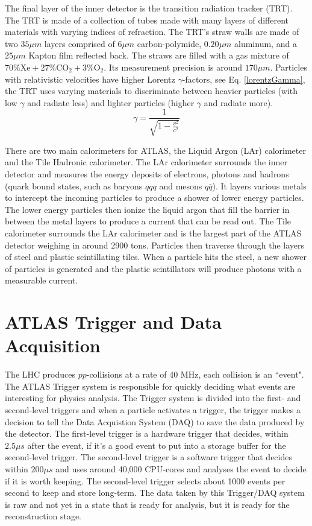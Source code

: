 The final layer of the inner detector is the transition radiation tracker (TRT). 
The TRT is made of a collection of tubes made with many layers of different materials with varying indices of refraction.
The TRT's straw walls are made of two $35\mu m$ layers comprised of $6\mu m$ carbon-polymide, $0.20 \mu m$ aluminum, and a $25\mu m$ Kapton film reflected back.\cite{TRT_2008}
The straws are filled with a gas mixture of $70\% \text{Xe} + 27\% \text{CO}_2 + 3\% \text{O}_2$. 
Its measurement precision is around $170 \mu m$. 
Particles with relativistic velocities have higher Lorentz $\gamma$-factors, see Eq. \eqref{lorentzGamma}, the TRT uses varying materials to discriminate between heavier particles (with low $\gamma$ and radiate less) and lighter particles (higher $\gamma$ and radiate more). \cite{Mindur:2139567}
\begin{equation}\label{lorentzGamma}
    \gamma = \frac{1}{\sqrt{1 - \frac{v^2}{c^2}}}
\end{equation}

There are two main calorimeters for ATLAS, the Liquid Argon (LAr) calorimeter and the Tile Hadronic calorimeter.
The LAr calorimeter surrounds the inner detector and measures the energy deposits of electrons, photons and hadrons (quark bound states, such as baryons $qqq$ and mesons $q\bar{q}$). 
It layers various metals to intercept the incoming particles to produce a shower of lower energy particles. 
The lower energy particles then ionize the liquid argon that fill the barrier in between the metal layers to produce a current that can be read out.
The Tile calorimeter surrounds the LAr calorimeter and is the largest part of the ATLAS detector weighing in around 2900 tons. 
Particles then traverse through the layers of steel and plastic scintillating tiles. 
When a particle hits the steel, a new shower of particles is generated and the plastic scintillators will produce photons with a measurable current.

\section{ATLAS Trigger and Data Acquisition}

The LHC produces $pp$-collisions at a rate of 40 MHz, each collision is an ``event". 
The ATLAS Trigger system is responsible for quickly deciding what events are interesting for physics analysis.
The Trigger system is divided into the first- and second-level triggers and when a particle activates a trigger, the trigger makes a decision to tell the Data Acquistion System (DAQ) to save the data produced by the detector. 
The first-level trigger is a hardware trigger that decides, within $2.5 \mu s$ after the event, if it's a good event to put into a storage buffer for the second-level trigger.
The second-level trigger is a software trigger that decides within $200 \mu s$ and uses around 40,000 CPU-cores and analyses the event to decide if it is worth keeping. 
The second-level trigger selects about 1000 events per second to keep and store long-term. \cite{Trigger-DAQ}
The data taken by this Trigger/DAQ system is raw and not yet in a state that is ready for analysis, but it is ready for the reconstruction stage. 

